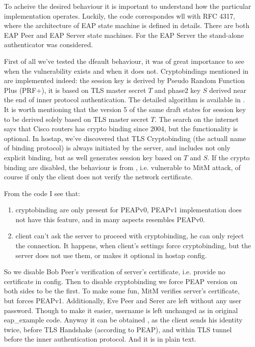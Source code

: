 \documentclass{extarticle}
\begin{document}
To acheive the desired behaviour it is important to understand
how the particular implementation operates. Luckily,
the code correspondes wll with RFC 4317, where the architecture of EAP state
machine is defined in details.
There are both EAP Peer and EAP Server state machines.
For the EAP Server the stand-alone authenticator was considered.

First of all we've tested the dfeault behaviour,
it was of great importance to see when the vulnerability exists and when
it does not.
Cryptobindings mentioned in \cite{tap2002} are implemented indeed:
the session key is derived by Pseudo Random Function Plus (PRF+),
it is based on TLS master secret $T$ and phase2 key $S$
derived near the end of inner protocol authentication.
The detailed algorithm is available in \cite{josefsson-draft-10}.
It is worth mentioning that the version 5 \cite{josefsson-draft-05}
of the same draft
states for session key to be derived solely based on TLS master secret $T$.
The search on the internet says that Cisco routers has crypto binding since 2004,
but the functionality is optional.
In hostap, we've discovered that TLS Cryptobinding
(the actuall name of binding protocol)
is always initiated by the server,
and includes not only explicit binding,
but as well generates session key based on $T$ and $S$.
If the crypto binding are disabled,
the behaviour is from \cite{josefsson-draft-05},
i.e. vulnerable to MitM attack,
of course if only the client does not verify the network certificate.

From the code I see that:
\begin{enumerate}
  \item cryptobinding are only present for PEAPv0,
    PEAPv1 implementation does not have this feature,
    and in many aspects resembles PEAPv0.
  \item client can't ask the server to proceed with cryptobinding,
    he can only reject the connection.
    It happens, when client's settings force
    cryptobinding, but the server does not use them, or makes it optional
    in hostap config.
\end{enumerate}

So we disable Bob Peer's verification of server's certificate,
i.e. provide no certificate in config.
Then to disable cryptobinding we force PEAP version on both sides
to be the first. To make some fun,
MitM verifies server's certificate, but forces PEAPv1.
Additionally, Eve Peer and Serer are left without any user password.
Though to make it easier, username is left unchanged
as in original eap\_example code.
Anyway it can be obtained , as the client sends his identity twice,
before TLS Handshake (according to PEAP),
and within TLS tunnel before the inner authentication protocol.
And it is in plain text.
\end{document}
